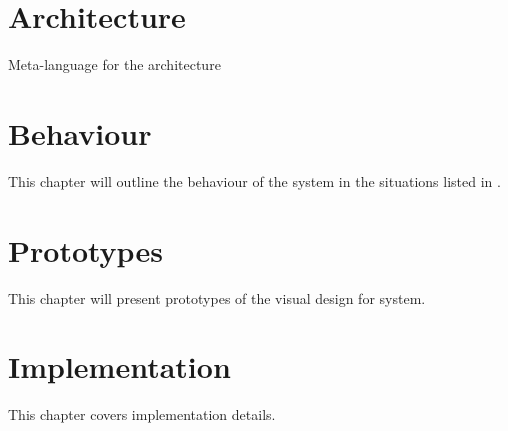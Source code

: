 	
	\chapter{Architecture}
	Meta-language for the architecture
	
	\chapter{Behaviour}
	This chapter will outline the behaviour of the system in the situations listed in .
	
		
	\chapter{Prototypes}
	This chapter will present prototypes of the visual design for system.
	
	
	\chapter{Implementation}
	This chapter covers implementation details.
	
	
	
	
	
	
	
	
	
	
	
	
	\afterpage{\thispagestyle{empty}}

	
	
	\label{lastpagewithoutappendix}

	\appendix
	
	\cleardoublepage

